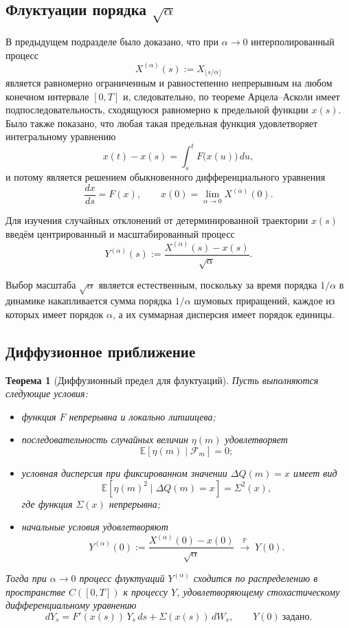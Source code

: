 \documentclass[12pt,a4paper]{article}
\newtheorem{theorem}{Теорема}
\theoremstyle{definition}
\begin{document}
\subsection{Флуктуации порядка $\sqrt{\alpha}$}

В предыдущем подразделе было доказано,
что при $\alpha \to 0$
интерполированный процесс
\[
X^{(\alpha)}(s)
:=
X_{\lfloor s/\alpha \rfloor}
\]
является равномерно ограниченным и равностепенно непрерывным
на любом конечном интервале $[0,T]$
и, следовательно, по теореме Арцела--Асколи
имеет подпоследовательность,
сходящуюся равномерно к предельной функции $x(s)$.
Было также показано, что любая такая предельная функция
удовлетворяет интегральному уравнению
\[
x(t)-x(s)
=
\int_s^t F\bigl(x(u)\bigr)\,du,
\]
и потому является решением обыкновенного дифференциального уравнения
\[
\frac{dx}{ds}=F(x),
\qquad x(0)=\lim_{\alpha\to0} X^{(\alpha)}(0).
\]

Для изучения случайных отклонений
от детерминированной траектории $x(s)$
введём центрированный и масштабированный процесс
\begin{equation}
\label{eq:def_Y_alpha}
Y^{(\alpha)}(s)
:=
\frac{X^{(\alpha)}(s)-x(s)}{\sqrt{\alpha}}.
\end{equation}

Выбор масштаба $\sqrt{\alpha}$ является естественным,
поскольку за время порядка $1/\alpha$
в динамике накапливается сумма порядка $1/\alpha$
шумовых приращений,
каждое из которых имеет порядок $\alpha$,
а их суммарная дисперсия имеет порядок единицы.

\subsection{Диффузионное приближение}

\begin{theorem}[Диффузионный предел для флуктуаций]
\label{thm:sde_limit_correct}
Пусть выполняются следующие условия:
\begin{itemize}
\item функция $F$ непрерывна и локально липшицева;
\item последовательность случайных величин $\eta(m)$ удовлетворяет
\[
\mathbb E[\eta(m)\mid \mathcal F_m]=0;
\]
\item условная дисперсия при фиксированном значении $\Delta Q(m)=x$
имеет вид
\[
\mathbb E[\eta(m)^2\mid \Delta Q(m)=x]
=
\Sigma^2(x),
\]
где функция $\Sigma(x)$ непрерывна;
\item начальные условия удовлетворяют
\[
Y^{(\alpha)}(0)
:=
\frac{X^{(\alpha)}(0)-x(0)}{\sqrt{\alpha}}
\;\xrightarrow{\;\mathbb P\;}\;
Y(0).
\]
\end{itemize}
Тогда при $\alpha\to0$
процесс флуктуаций $Y^{(\alpha)}$
сходится по распределению в пространстве $C([0,T])$
к процессу $Y$,
удовлетворяющему стохастическому дифференциальному уравнению
\[
dY_s
=
F'(x(s))\,Y_s\,ds
+
\Sigma(x(s))\,dW_s,
\qquad
Y(0)\ \text{задано}.
\]
\end{theorem}
\end{document}
